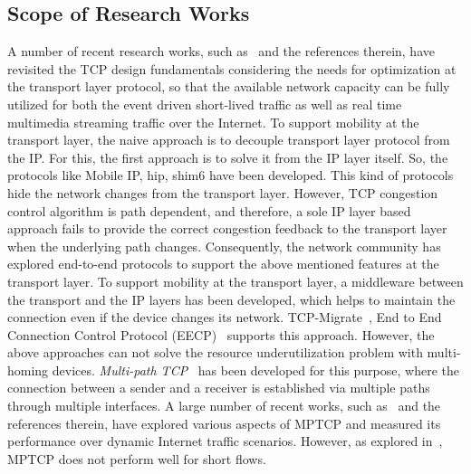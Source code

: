 \subsection{Scope of Research Works}
A number of recent research works, such as~\cite{Yadav2016,abdrabou2016experimental,de2016observing,de2016throughput,islam2016start,maity2017tcp,liu2016improving} and the references therein, have revisited the TCP design fundamentals considering the needs for optimization at the transport layer protocol, so that the available network capacity can be fully utilized for both the event driven short-lived traffic as well as real time multimedia streaming traffic over the Internet. To support mobility at the transport layer, the naive approach is to decouple transport layer protocol from the IP. For this, the first approach is to solve it from the IP layer itself. So, the protocols like Mobile IP, \acrfull{hip}, \acrfull{shim6} have been developed. This kind of protocols hide the network changes from the transport layer. However, TCP congestion control algorithm is path dependent, and therefore, a sole IP layer based approach fails to provide the correct congestion feedback to the transport layer when the underlying path changes.  Consequently, the network community has explored end-to-end protocols to support the above mentioned features at the transport layer. To support mobility at the transport layer, a middleware between the transport and the IP layers has been developed, which helps to maintain the connection even if the device changes its network. TCP-Migrate~\cite{TCP-Migrate},  End to End Connection Control Protocol (EECP)~\cite{ECCP} supports this approach.  However, the above approaches can not solve the resource underutilization problem with multi-homing devices. {\em Multi-path TCP}~\cite{scharf2013multipath} has been developed for this purpose, where the connection between a sender and a receiver is established via multiple paths through multiple interfaces. A large number of recent works, such as~\cite{oh2016feedback,barik2016lisa,OLIARamin2012} and the references therein, have explored various aspects of MPTCP and measured its performance over dynamic Internet traffic scenarios. However, as explored in~\cite{kheirkhah2016mmptcp,kheirkhah2015short}, MPTCP does not perform well for short flows. 

